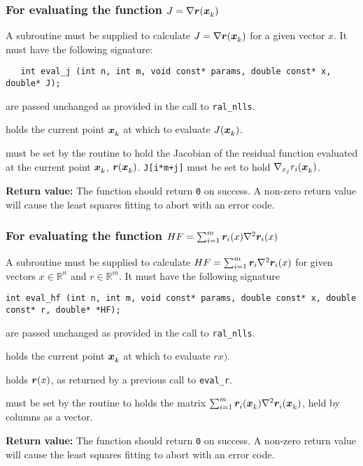 \documentclass{spec}
\begin{document}
\subsubsection{For evaluating the function $J = \nabla {\bm r}({\bm x}_{k}^{})$}
A subroutine must be supplied to calculate $J = \nabla {\bm r}({\bm x}_{k}^{})$ for a given vector $x$. It must have the following signature:

\begin{verbatim}
   int eval_j (int n, int m, void const* params, double const* x, double* J);
\end{verbatim}

\begin{description}
    are passed unchanged as provided in the call to
      {\tt ral\_nlls}.

    holds the current point ${\bm x}_{k}^{}$ at which to evaluate
      $J({\bm x}_{k}^{})$.

    must be set by the routine to hold the Jacobian of the residual
      function evaluated at the current point ${\bm x}_{k}^{}$, ${\bm r}({\bm x}_{k}^{})$.
      \texttt{J[i*m+j]} must be set to hold $\nabla_{x_j} r_i({\bm x}_{k}^{})$.
\end{description}
\textbf{Return value:} The function should return \texttt{0} on success. A
non-zero return value will cause the least squares fitting to abort with an
error code.

\subsubsection{For evaluating the function $HF = \sum_{i=1}^m {\bm r}_i(x) \nabla^2 {\bm r}_i(x)$}
A subroutine must be supplied to calculate $HF = \sum_{i=1}^m {\bm r}_i \nabla^2 {\bm r}_i(x)$ for given vectors $x \in \mathbb{R}^n$ and $r \in \mathbb{R}^m$. It must have the following signature

\begin{verbatim}
int eval_hf (int n, int m, void const* params, double const* x, double const* r, double* *HF);
\end{verbatim}

\begin{description}
    are passed unchanged as provided in the call to
      {\tt ral\_nlls}.

    holds the current point ${\bm x}_{k}^{}$ at which to evaluate $rx)$.

    holds ${\bm r}(x)$, as returned by a previous call to \texttt{eval\_r}.

    must be set by the routine to holds the matrix
      $\sum_{i = 1}^m {\bm r}_{i}^{}({\bm x}_{k}^{})\nabla^2{\bm r}_{i}^{}({\bm x}_{k}^{})$, held
      by columns as a vector.
\end{description}
\textbf{Return value:} The function should return \texttt{0} on success. A
non-zero return value will cause the least squares fitting to abort with an
error code.
\end{document}
